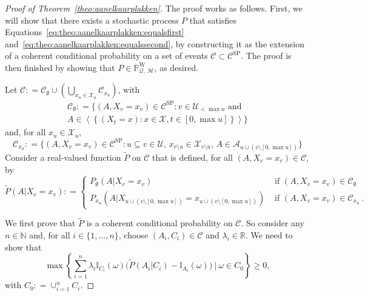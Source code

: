 \documentclass[10pt,a4paper]{paper}
\theoremstyle{definition}
\newcommand{\nats}{\mathbb{N}}
\newcommand{\reals}{\mathbb{R}}
\newcommand{\states}{\mathcal{X}}
\newcommand{\processes}{\mathbb{P}}
\newcommand{\wprocesses}{\processes^{\mathrm{W}}}
\newcommand{\ind}[1]{\mathbb{I}_{#1}}
\newcommand{\rateset}{\mathcal{Q}}
\newcommand{\coloneqq}{:\!=}
\begin{document}
\begin{proof}[Proof of Theorem~\ref{theo:aanelkaarplakken}]
The proof works as follows. First, we will show that there exists a stochastic process $P$ that satisfies Equations~\eqref{eq:theo:aanelkaarplakken:equalsfirst} and~\eqref{eq:theo:aanelkaarplakken:equalssecond}, by constructing it as the extension of a coherent conditional probability on a set of events $\mathcal{C}\subset\mathcal{C}^\mathrm{SP}$. The proof is then finished by showing that $P\in\wprocesses_{\rateset,\,\mathcal{M}}$, as desired.

Let $\mathcal{C}\coloneqq\mathcal{C}_\emptyset\cup(\bigcup_{x_u\in\states_u}\mathcal{C}_{x_u})$, with
\begin{multline}\label{eq:theo:aanelkaarplakken:firstpartofdomain}
\mathcal{C}_\emptyset\coloneqq
\{(A,X_v=x_v)\in\mathcal{C}^{\mathrm{SP}}\colon v\in\mathcal{U}_{< \max u}\text{~and~}\\A\in\left\langle
\left\{
(X_t=x)
\colon
x\in\states,t\in[0,\max u]
\right\}
\right\rangle\}
\end{multline}
and, for all $x_u\in\states_u$,
\begin{equation}\label{eq:theo:aanelkaarplakken:secondpartofdomain}
\mathcal{C}_{x_u}\coloneqq\{
(A,X_v=x_v)\in\mathcal{C}^\mathrm{SP}
\colon
u\subseteq v\in\mathcal{U},\,
x_{v\setminus u}\in\states_{v\setminus u},\,
 A\in\mathcal{A}_{u\cup(v\setminus[0,\max u])}
\}
\end{equation}
Consider a real-valued function $\tilde{P}$ on $\mathcal{C}$ that is defined, for all $(A,X_v=x_v)\in\mathcal{C}$, by
\begin{equation}\label{eq:theo:aanelkaarplakken:defPtilde}
\tilde{P}(A\vert X_v=x_v)
\coloneqq
\begin{cases}
P_\emptyset(A\vert X_v=x_v)&\text{~if $(A,X_v=x_v)\in\mathcal{C}_\emptyset$}\\
P_{x_u}(A\vert 
X_{u\cup(v\setminus[0,\max u])}=x_{u\cup(v\setminus[0,\max u])})&\text{~if $(A,X_v=x_v)\in\mathcal{C}_{x_u}$}\,.
\end{cases}
\end{equation}


We first prove that $\tilde{P}$ is a coherent conditional probability on $\mathcal{C}$. So consider any $n\in\nats$ and, for all $i\in\{1,\dots,n\}$, choose $(A_i,C_i)\in\mathcal{C}$ and $\lambda_i\in\reals$. We need to show that
\begin{equation}\label{eq:theo:aanelkaarplakken:coh}
\max\left\{\sum_{i=1}^n\lambda_i\ind{C_i}(\omega)\bigl(\tilde{P}(A_i\vert C_i)-\ind{A_i}(\omega)\bigr)~\Bigg\vert~\omega\in C_0\right\}\geq0,
\end{equation}
with $C_0\coloneqq\cup_{i=1}^nC_i$.


\end{proof}
\end{document}
